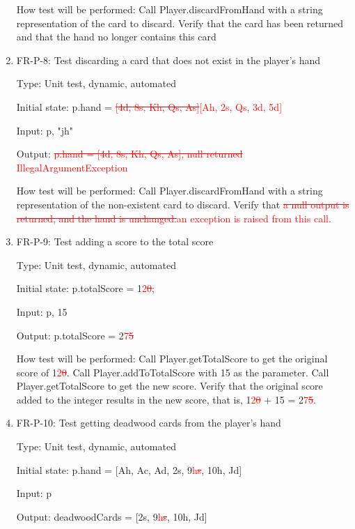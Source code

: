 \documentclass[12pt, titlepage]{article}
\begin{document}
\begin{enumerate}
    How test will be performed: Call Player.discardFromHand with a string representation of the card to discard. Verify that the card has been returned and that the hand no longer contains this card
    
    \item{FR-P-8: Test discarding a card that does not exist in the player's hand}
    
    Type: Unit test, dynamic, automated
    					
    Initial state: p.hand = \textcolor{red}{\sout{[4d, 8s, Kh, Qs, As]}[Ah, 2s, Qs, 3d, 5d]}
    
    Input: p, "jh"
    
    Output: \textcolor{red}{\sout{p.hand = [4d, 8s, Kh, Qs, As], null returned} \\ IllegalArgumentException}
    
    How test will be performed: Call Player.discardFromHand with a string representation of the non-existent card to discard. Verify that \textcolor{red}{\sout{a null output is returned, and the hand is unchanged.}an exception is raised from this call.}
    
    \item{FR-P-9: Test adding a score to the total score}
    
    Type: Unit test, dynamic, automated
    					
    Initial state: p.totalScore = 1\textcolor{red}{2\sout{0}};
    
    Input: p, 15
    
    Output: p.totalScore = 2\textcolor{red}{7\sout{5}}
    
    How test will be performed: Call Player.getTotalScore to get the original score of 1\textcolor{red}{2\sout{0}}. Call Player.addToTotalScore with 15 as the parameter. Call Player.getTotalScore to get the new score. Verify that the original score added to the integer results in the new score, that is, 1\textcolor{red}{2\sout{0}} + 15 = 2\textcolor{red}{7\sout{5}}.
    
    \item{FR-P-10: Test getting deadwood cards from the player's hand}
    
    Type: Unit test, dynamic, automated
    					
    Initial state: p.hand = [Ah, Ac, Ad, 2s, 9\textcolor{red}{h\sout{s}}, 10h, Jd]
    
    Input: p
    
    Output: deadwoodCards = [2s, 9\textcolor{red}{h\sout{s}}, 10h, Jd]
    

\end{enumerate}
\end{document}
